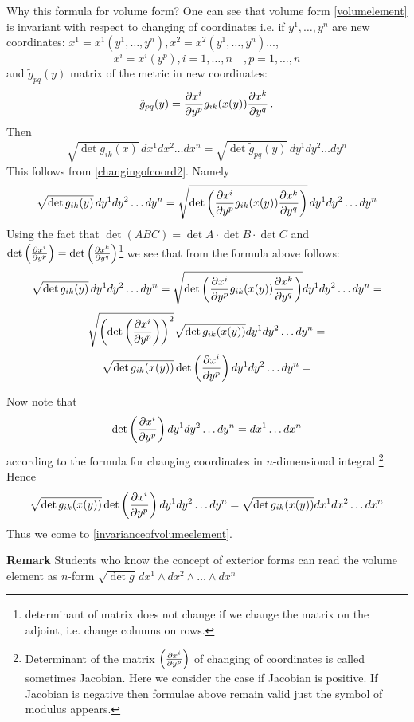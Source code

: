 \documentclass[12pt]{article}
\theoremstyle{theorem}
\numberwithin{equation}{section}
\begin{document}
{\footnotesize Why this formula for  volume form?
One can see that  volume form \eqref{volumelement} is invariant with respect 
to changing of coordinates
 i.e. if $y^1,\dots,y^n$ are new coordinates:
    $x^1=x^1(y^1,\dots,y^n), x^2=x^2(y^1,\dots,y^n)...$,
                      $$
          x^i=x^i(y^p), i=1,\dots,n\quad, p=1,\dots,n
                      $$
and   $\tilde g_{pq}(y)$ matrix of the metric in new coordinates:
                       \begin{equation}\label{changingofcoord2}
    \tilde g_{pq}(y)={\partial x^i\over \partial y^{p}}g_{ik}(x(y))
             {\partial x^k\over \partial y^{q}}\,.
\end{equation}
Then
                    \begin{equation}\label{invarianceofvolumeelement}
 \sqrt {\det g_{ik}(x)}\,dx^1 dx^2 \dots dx^n=
 \sqrt {\det \tilde g_{pq}(y)}\,dy^1 dy^2 \dots dy^n
\end{equation}
This follows from \eqref{changingofcoord2}. Namely
                             $$
\sqrt {\det g_{ik}(y)}\,dy^1 dy^2 \dots dy^n=
\sqrt {\det \left({\partial x^i\over \partial y^{p}}g_{ik}(x(y))
             {\partial x^k\over \partial y^{q}}\right)}\,dy^1 dy^2 \dots dy^n
                             $$
Using the fact that $\det (ABC)=\det A\cdot \det B\cdot \det C$
and  $\det \left({\partial x^i\over \partial y^{p}}\right)=
\det \left({\partial x^k\over \partial y^{q}}\right)$\footnote{determinant of matrix does not change
if we change the matrix on the adjoint, i.e. change columns on rows.} we see that
from the formula above follows:
           $$
           \sqrt {\det g_{ik}(y)}\,dy^1 dy^2 \dots dy^n=
\sqrt {\det \left({\partial x^i\over \partial y^{p}}g_{ik}(x(y))
             {\partial x^k\over \partial y^{q}}\right)}
          dy^1 dy^2 \dots dy^n=
           $$
           $$
\sqrt {\left(\det
        \left(
    {\partial x^i\over \partial y^{p}}
    \right)\right)^2}
     \sqrt {\det g_{ik}(x(y))}
     dy^1 dy^2 \dots dy^n=
           $$
\begin{equation}\label{transformofvolumeform4}
\sqrt {\det g_{ik}(x(y))}
         \det
        \left(
    {\partial x^i\over \partial y^{p}}
    \right)
    dy^1 dy^2 \dots dy^n=
\end{equation}


Now note that   $$
\det \left({\partial x^i\over \partial y^{p}}\right)dy^1 dy^2 \dots dy^n=dx^1\dots dx^n
                $$
according to the formula for changing coordinates in $n$-dimensional integral
\footnote{Determinant of the matrix $\left({\partial x^i\over \partial y^{p}}\right)$ of changing of coordinates
is called sometimes Jacobian. Here we consider the case if Jacobian is positive.
If Jacobian is negative then formulae above remain valid just the symbol of modulus appears.}.
Hence
\begin{equation}\label{transformofvolumeform5}
\sqrt {\det g_{ik}(x(y))}\det
      \left(
 {\partial x^i\over \partial y^{p}}
 \right) dy^1 dy^2 \dots dy^n=
\sqrt {\det g_{ik}(x(y))}dx^1 dx^2 \dots dx^n
\end{equation}
Thus we come to \eqref{invarianceofvolumeelement}.


{\footnotesize
{\bf Remark} 
Students who know the concept of exterior forms
 can read the volume element as $n$-form
     $\sqrt {{\det g}}\,
dx^1\wedge dx^2\wedge \dots \wedge dx^n$

}

 }
\end{document}
